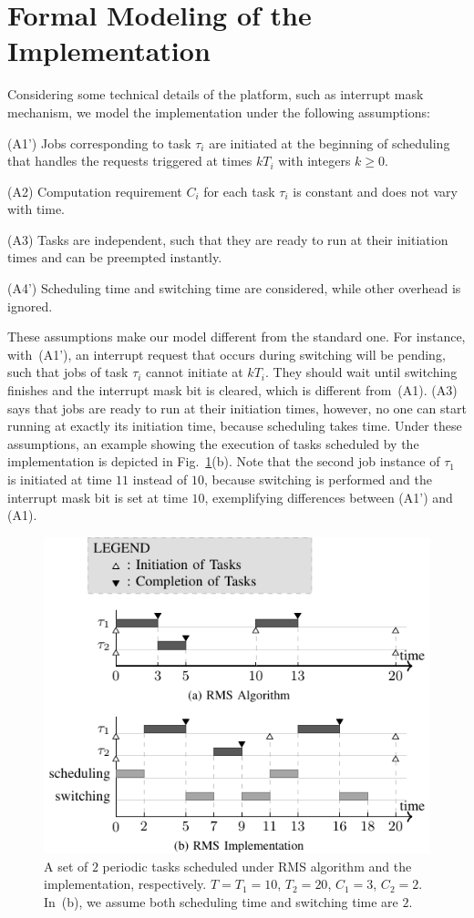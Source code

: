 \documentclass[journal]{IEEEtranTIE}
\begin{document}
\section{Formal Modeling of the Implementation}
\label{s:formalism}
Considering some technical details of the platform, such as interrupt
mask mechanism, we model the implementation under the following
assumptions:

(A1') Jobs corresponding to task $\tau_i$ are initiated at the
beginning of scheduling that handles the requests triggered at times
$kT_i$ with integers $k\ge 0$.

(A2) Computation requirement $C_i$ for each task $\tau_i$ is constant
and does not vary with time.

(A3) Tasks are independent, such that they are ready to run at their
initiation times and can be preempted instantly.

(A4') Scheduling time and switching time are considered, while other
overhead is ignored.

These assumptions make our model different from the standard one. For
instance, with~(A1'), an interrupt request that occurs during
switching will be pending, such that jobs of task $\tau_i$ cannot
initiate at $kT_i$. They should wait until switching finishes and the
interrupt mask bit is cleared, which is different from~(A1). (A3) says
that jobs are ready to run at their initiation times, however, no one
can start running at exactly its initiation time, because scheduling
takes time. Under these assumptions, an example showing the execution
of tasks scheduled by the implementation is depicted in
Fig.~\ref{f:example}(b). Note that the second job instance of $\tau_1$
is initiated at time $11$ instead of $10$, because switching is
performed and the interrupt mask bit is set at time $10$, exemplifying
differences between (A1') and (A1).

\begin{figure}[!t]
\centering
\includegraphics{FIG2_15-TIE-3480.pdf}
\caption{A set of $2$ periodic tasks scheduled under RMS algorithm and
  the implementation, respectively. $T=T_1=10$, $T_2=20$, $C_1=3$,
  $C_2=2$. In~(b), we assume both scheduling time and switching time
  are $2$.}
\label{f:example}
\end{figure}
\end{document}
